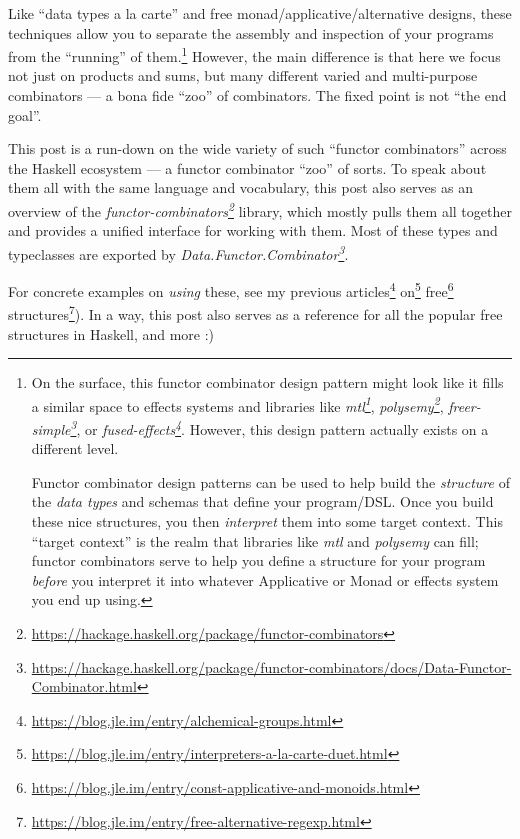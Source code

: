 \documentclass[]{article}
\renewcommand{\href}[2]{#2\footnote{\url{#1}}}
\begin{document}
Like ``data types a la carte'' and free monad/applicative/alternative designs,
these techniques allow you to separate the assembly and inspection of your
programs from the ``running'' of them.\footnote{On the surface, this functor
  combinator design pattern might look like it fills a similar space to effects
  systems and libraries like
  \emph{\href{https://hackage.haskell.org/package/mtl}{mtl}},
  \emph{\href{https://hackage.haskell.org/package/polysemy}{polysemy}},
  \emph{\href{https://hackage.haskell.org/package/freer-simple}{freer-simple}},
  or
  \emph{\href{https://hackage.haskell.org/package/fused-effects}{fused-effects}}.
  However, this design pattern actually exists on a different level.

  Functor combinator design patterns can be used to help build the
  \emph{structure} of the \emph{data types} and schemas that define your
  program/DSL. Once you build these nice structures, you then \emph{interpret}
  them into some target context. This ``target context'' is the realm that
  libraries like \emph{mtl} and \emph{polysemy} can fill; functor combinators
  serve to help you define a structure for your program \emph{before} you
  interpret it into whatever Applicative or Monad or effects system you end up
  using.} However, the main difference is that here we focus not just on
products and sums, but many different varied and multi-purpose combinators --- a
bona fide ``zoo'' of combinators. The fixed point is not ``the end goal''.

This post is a run-down on the wide variety of such ``functor combinators''
across the Haskell ecosystem --- a functor combinator ``zoo'' of sorts. To speak
about them all with the same language and vocabulary, this post also serves as
an overview of the
\emph{\href{https://hackage.haskell.org/package/functor-combinators}{functor-combinators}}
library, which mostly pulls them all together and provides a unified interface
for working with them. Most of these types and typeclasses are exported by
\emph{\href{https://hackage.haskell.org/package/functor-combinators/docs/Data-Functor-Combinator.html}{Data.Functor.Combinator}}.

For concrete examples on \emph{using} these, see my previous
\href{https://blog.jle.im/entry/alchemical-groups.html}{articles}
\href{https://blog.jle.im/entry/interpreters-a-la-carte-duet.html}{on}
\href{https://blog.jle.im/entry/const-applicative-and-monoids.html}{free}
\href{https://blog.jle.im/entry/free-alternative-regexp.html}{structures}). In a
way, this post also serves as a reference for all the popular free structures in
Haskell, and more :)
\end{document}
